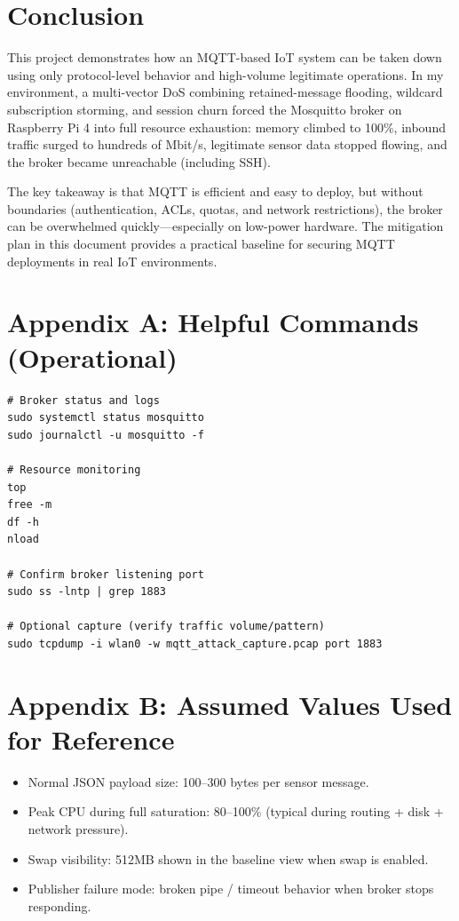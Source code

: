 \documentclass[11pt]{article}
\begin{document}
\section{Conclusion}
This project demonstrates how an MQTT-based IoT system can be taken down using only protocol-level behavior and high-volume legitimate operations. In my environment, a multi-vector DoS combining retained-message flooding, wildcard subscription storming, and session churn forced the Mosquitto broker on Raspberry Pi 4 into full resource exhaustion: memory climbed to 100\%, inbound traffic surged to hundreds of Mbit/s, legitimate sensor data stopped flowing, and the broker became unreachable (including SSH).

The key takeaway is that MQTT is efficient and easy to deploy, but without boundaries (authentication, ACLs, quotas, and network restrictions), the broker can be overwhelmed quickly---especially on low-power hardware. The mitigation plan in this document provides a practical baseline for securing MQTT deployments in real IoT environments.

\appendix
\section{Appendix A: Helpful Commands (Operational)}
\begin{lstlisting}[style=cmd]
# Broker status and logs
sudo systemctl status mosquitto
sudo journalctl -u mosquitto -f

# Resource monitoring
top
free -m
df -h
nload

# Confirm broker listening port
sudo ss -lntp | grep 1883

# Optional capture (verify traffic volume/pattern)
sudo tcpdump -i wlan0 -w mqtt_attack_capture.pcap port 1883
\end{lstlisting}

\section{Appendix B: Assumed Values Used for Reference}
\begin{itemize}
  \item Normal JSON payload size: 100--300 bytes per sensor message.
  \item Peak CPU during full saturation: 80--100\% (typical during routing + disk + network pressure).
  \item Swap visibility: 512MB shown in the baseline view when swap is enabled.
  \item Publisher failure mode: broken pipe / timeout behavior when broker stops responding.
\end{itemize}
\end{document}
